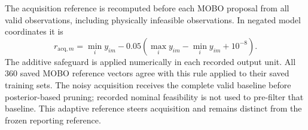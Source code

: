 The acquisition reference is recomputed before each MOBO proposal from all
valid observations, including physically infeasible observations. In negated
model coordinates it is
\begin{equation}
 r_{\mathrm{acq},m}=\min_i y_{im}
 -0.05\left(\max_i y_{im}-\min_i y_{im}+10^{-8}\right).
\end{equation}
The additive safeguard is applied numerically in each recorded output unit.
All 360 saved MOBO reference vectors agree with this rule applied to their
saved training sets. The noisy acquisition receives the complete valid
baseline before posterior-based pruning; recorded nominal feasibility is not
used to pre-filter that baseline. This adaptive reference steers acquisition
and remains distinct from the frozen reporting reference.

